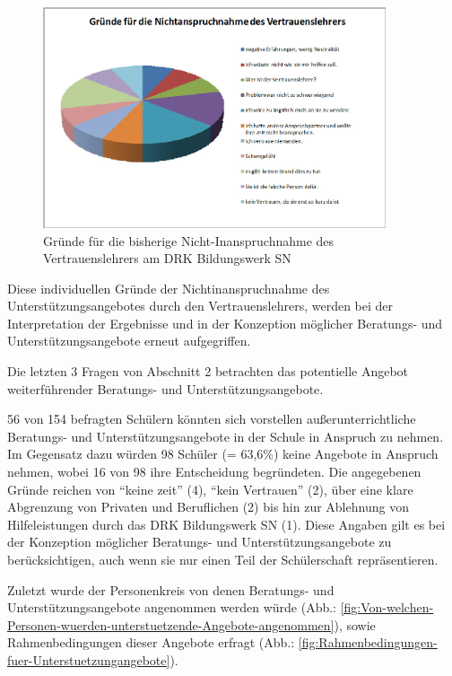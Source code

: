 \begin{figure}[hp]
	\centering
		\includegraphics[width=0.9\textwidth]{images/Gruende-fuer-die-Nichtinaspruchnahme-des-Vertrauenslehrers.jpg}
	\caption{Gründe für die bisherige Nicht-Inanspruchnahme des Vertrauenslehrers am DRK Bildungswerk SN}
	\label{fig:Gruende-fuer-die-Nichtinaspruchnahme-des-Vertrauenslehrers}
\end{figure}

\noindent
Diese individuellen Gründe der Nichtinanspruchnahme des Unterstützungsangebotes durch den Vertrauenslehrers, werden bei der Interpretation der Ergebnisse und in der Konzeption möglicher Beratungs- und Unterstützungsangebote erneut aufgegriffen.

Die letzten 3 Fragen von Abschnitt 2 betrachten das potentielle Angebot weiterführender Beratungs- und Unterstützungsangebote. 

56 von 154 befragten Schülern könnten sich vorstellen außerunterrichtliche Beratungs- und Unterstützungsangebote in der Schule in Anspruch zu nehmen. Im Gegensatz dazu würden 98 Schüler (= 63,6\%) keine Angebote in Anspruch nehmen, wobei 16 von 98 ihre Entscheidung begründeten. Die angegebenen Gründe reichen von "`keine  zeit"' (4), "`kein Vertrauen"' (2), über eine klare Abgrenzung von Privaten und Beruflichen (2) bis hin zur Ablehnung von Hilfeleistungen durch das DRK Bildungswerk SN (1). Diese Angaben gilt es bei der Konzeption möglicher Beratungs- und Unterstützungsangebote zu berücksichtigen, auch wenn sie nur einen Teil der Schülerschaft repräsentieren.

Zuletzt wurde der Personenkreis von denen Beratungs- und Unterstützungsangebote angenommen werden würde (Abb.: \ref{fig:Von-welchen-Personen-wuerden-unterstuetzende-Angebote-angenommen}), sowie Rahmenbedingungen dieser Angebote erfragt (Abb.: \ref{fig:Rahmenbedingungen-fuer-Unterstuetzungangebote}). 

